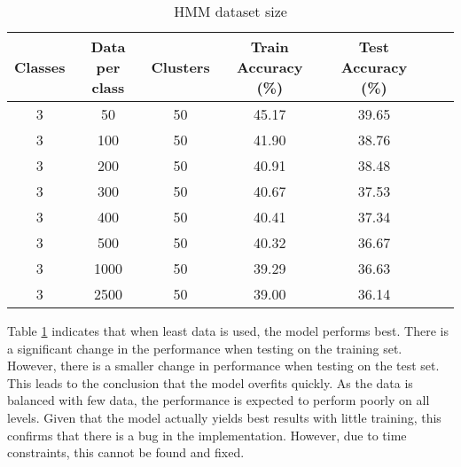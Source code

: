 \begin{table}[h!]
\begin{center}
\begin{tabular}{| c | c | c | c | c | c | c |}
\hline
 {\textbf{Classes}} 	 
 & {\textbf{Data per class}} 					& {\textbf{Clusters}} 
 & {\textbf{Train Accuracy (\%)}} 					& {\textbf{Test Accuracy (\%)}} 
 \\
\hline
3 	 		& 50			& 50			& 45.17		& 39.65		\\
3 	 		& 100 		& 50			& 41.90		& 38.76		\\
3 	 		& 200 		& 50			& 40.91		& 38.48		\\
3 	 		& 300 		& 50			& 40.67		& 37.53		\\
3 	 		& 400 		& 50			& 40.41		& 37.34		\\
3 	 		& 500 		& 50			& 40.32		& 36.67		\\
3 	 		& 1000 		& 50			& 39.29		& 36.63		\\
3 	 		& 2500 		& 50			& 39.00		& 36.14		\\
\hline
\end{tabular}
\caption{HMM dataset size}
\label{table:HMMdataset}
\end{center}
\end{table}

Table \ref{table:HMMdataset} indicates that when least data is used, the model performs best. There is a significant change in the performance when testing on the training set. However, there is a smaller change in performance when testing on the test set. This leads to the conclusion that the model overfits quickly. As the data is balanced with few data, the performance is expected to perform poorly on all levels. Given that the model actually yields best results with little training, this confirms that there is a bug in the implementation. However, due to time constraints, this cannot be found and fixed.





